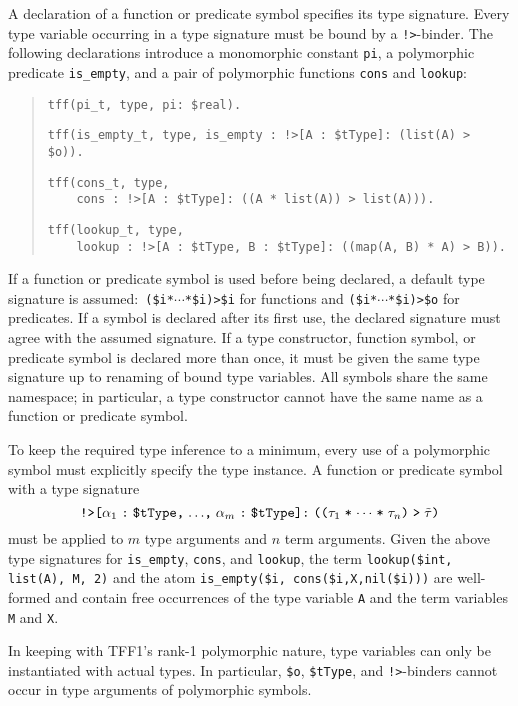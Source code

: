 A declaration of a function or predicate symbol specifies its type signature.
Every type variable occurring in a type signature must be bound by a
{\tt !>}-binder.
The following declarations introduce a monomorphic
constant {\tt pi}, a polymorphic predicate
{\tt is\_empty}, and a pair of polymorphic functions {\tt cons} and {\tt lookup}:
\begin{quote}
\verb+tff(pi_t, type, pi: $real).+
\par\smallskip
\verb+tff(is_empty_t, type, is_empty : !>[A : $tType]: (list(A) > $o)).+\kern-10mm
\par\smallskip
\pagebreak[2] %
\verb+tff(cons_t, type,+\\
\verb+    cons : !>[A : $tType]: ((A * list(A)) > list(A))).+
\par\smallskip
\pagebreak[2] %
\verb+tff(lookup_t, type,+\\
\verb+    lookup : !>[A : $tType, B : $tType]: ((map(A, B) * A) > B)).+\kern-10mm
\end{quote}
If a function or predicate symbol is used before being declared, a
default type signature is assumed:\ {\tt (\$i\;*\;${\cdots}$\;*\;\$i)\;>\;\$i}
for functions and {\tt (\$i\;*\;${\cdots}$\;*\;\$i)\;>\;\$o} for predicates.
If a symbol is declared after its first use, the declared signature
must agree with the assumed signature.
%
If a type constructor, function symbol, or predicate symbol is declared more
than once, it must be given the same type signature up to renaming of bound
type variables.
All symbols share the same namespace; in particular, a type constructor
cannot have the same name as a function or predicate symbol.

 To keep the required type
inference to a minimum, every use of a polymorphic symbol must explicitly
specify the type instance. A function or predicate symbol with a type signature
\[\hbox{{\tt !>[$\alpha_1$\;:\;\$tType,\;${\dots}$,\;$\alpha_m$\;:\;\$tType]:\;%
(($\tau_1$\;*\;${\cdots}$\;*\;$\tau_n$)\;>\;$\tilde \tau$)}}\]
must be applied to $m$ type arguments and $n$ term arguments. Given the above
type signatures for {\tt is\_empty}, {\tt cons}, and {\tt lookup}, the term
\hbox{\tt lookup(\$int,\;\,list(A),\;\,M,\;\,2)}
and the atom
\hbox{\tt is\_empty(\$i,\;\,cons(\$i,\;X,\;nil(\$i)))}
are well-formed and contain free occurrences of the type variable {\tt A}
and the term variables {\tt M} and {\tt X}.

In keeping with TFF1's rank-1 polymorphic nature, type variables can only be
instantiated with actual types. In particular, \verb+$o+, \verb+$tType+,
and {\tt !>}-binders cannot occur in type arguments of polymorphic symbols.


